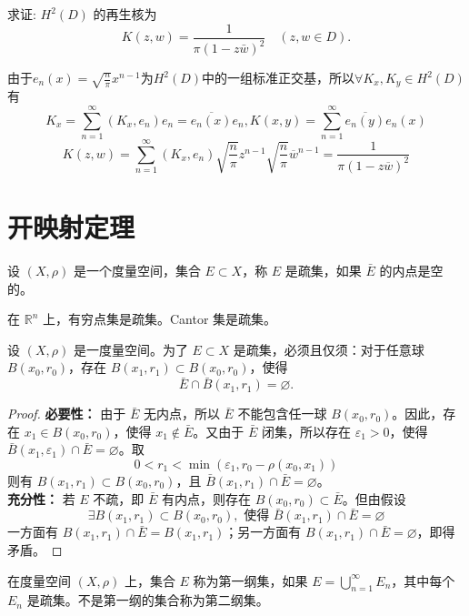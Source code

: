 \documentclass[lang=cn,newtx,10pt,scheme=chinese,thmcnt=chapter]{elegantbook}
\begin{document}
\begin{problem}
求证: $H^2(D)$ 的再生核为
\begin{equation*}
K(z, w)=\frac{1}{\pi(1-z \bar{w})^2} \quad(z, w \in D) .
\end{equation*}

\end{problem}
\begin{solution}
由于$e_n(x)=\sqrt{\frac{n}{\pi}}x^{n-1}$为$H^2(D)$中的一组标准正交基，所以$\forall K_x,K_y\in H^2{(D)}$有
\[K_x=\sum\limits_{n=1}^\infty(K_x,e_n)e_n=\overline{e_n(x)}e_n,K(x,y)=\sum\limits_{n=1}^\infty\overline{e_n(y)}e_n(x)
\]
\[K(z,w)=\sum\limits_{n=1}^\infty(K_x,e_n)\sqrt{\frac{n}{\pi}}z^{n-1}\sqrt{\frac{n}{\pi}}\overline{w}^{n-1}=\frac{1}{\pi(1-z\overline{w})^2}\]
\end{solution}
\newpage
\section{开映射定理}
\begin{definition}
	设 $( {X} , \rho)$ 是一个度量空间，集合 $E \subset {X}$，称 $E$ 是疏集，如果 $\bar{E}$ 的内点是空的。
\end{definition}

\begin{example}
	在 $\mathbb{R}^n$ 上，有穷点集是疏集。Cantor 集是疏集。
\end{example}

\begin{proposition}
	设 $( {X} , \rho)$ 是一度量空间。为了 $E \subset {X}$ 是疏集，必须且仅须：对于任意球 $B\left(x_0, r_0\right)$，存在 $B\left(x_1, r_1\right) \subset B\left(x_0, r_0\right)$，使得
	\[
	\bar{E} \cap \bar{B}\left(x_1, r_1\right) = \varnothing.
	\]
\end{proposition}

\begin{proof}
	\textbf{必要性：} 由于 $\bar{E}$ 无内点，所以 $\bar{E}$ 不能包含任一球 $B\left(x_0, r_0\right)$。因此，存在 $x_1 \in B\left(x_0, r_0\right)$，使得 $x_1 \notin \bar{E}$。又由于 $\bar{E}$ 闭集，所以存在 $\varepsilon_1 > 0$，使得 $\bar{B}\left(x_1, \varepsilon_1\right) \cap \bar{E} = \varnothing$。取
	\[
	0 < r_1 < \min \left( \varepsilon_1, r_0 - \rho\left(x_0, x_1\right) \right)
	\]
	则有 $B\left(x_1, r_1\right) \subset B\left(x_0, r_0\right)$，且 $\bar{B}\left(x_1, r_1\right) \cap \bar{E} = \varnothing$。\\
	\textbf{充分性：} 若 $E$ 不疏，即 $\bar{E}$ 有内点，则存在 $B\left(x_0, r_0\right) \subset \bar{E}$。但由假设
	\[
	\exists B\left(x_1, r_1\right) \subset B\left(x_0, r_0\right), \text{ 使得 } \bar{B}\left(x_1, r_1\right) \cap \bar{E} = \varnothing
	\]
	一方面有 $B\left(x_1, r_1\right) \cap \bar{E} = B\left(x_1, r_1\right)$；另一方面有 $B\left(x_1, r_1\right) \cap \bar{E} = \varnothing$，即得矛盾。
\end{proof}
\begin{definition}
	在度量空间 $( {X} , \rho)$ 上，集合 $E$ 称为第一纲集，如果 $E = \bigcup_{n=1}^{\infty} E_n$，其中每个 $E_n$ 是疏集。不是第一纲的集合称为第二纲集。
\end{definition}
\end{document}
